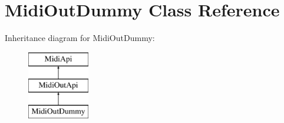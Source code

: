 \hypertarget{class_midi_out_dummy}{}\section{Midi\+Out\+Dummy Class Reference}
\label{class_midi_out_dummy}
Inheritance diagram for Midi\+Out\+Dummy\+:\begin{figure}[H]
\begin{center}
\leavevmode
\includegraphics[height=3.000000cm]{class_midi_out_dummy}
\end{center}
\end{figure}
